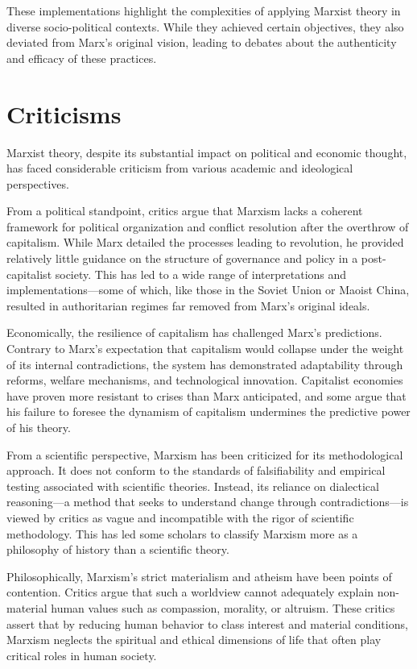 \documentclass[14pt, russian]{matmex-diploma-custom}
\begin{document}
These implementations highlight the complexities of applying Marxist theory in diverse socio-political contexts. While they achieved certain objectives, they also deviated from Marx's original vision, leading to debates about the authenticity and efficacy of these practices.

\section{Criticisms}

Marxist theory, despite its substantial impact on political and economic thought, has faced considerable criticism from various academic and ideological perspectives.

From a political standpoint, critics argue that Marxism lacks a coherent framework for political organization and conflict resolution after the overthrow of capitalism. While Marx detailed the processes leading to revolution, he provided relatively little guidance on the structure of governance and policy in a post-capitalist society. This has led to a wide range of interpretations and implementations—some of which, like those in the Soviet Union or Maoist China, resulted in authoritarian regimes far removed from Marx's original ideals.

Economically, the resilience of capitalism has challenged Marx’s predictions. Contrary to Marx's expectation that capitalism would collapse under the weight of its internal contradictions, the system has demonstrated adaptability through reforms, welfare mechanisms, and technological innovation. Capitalist economies have proven more resistant to crises than Marx anticipated, and some argue that his failure to foresee the dynamism of capitalism undermines the predictive power of his theory.

From a scientific perspective, Marxism has been criticized for its methodological approach. It does not conform to the standards of falsifiability and empirical testing associated with scientific theories. Instead, its reliance on dialectical reasoning—a method that seeks to understand change through contradictions—is viewed by critics as vague and incompatible with the rigor of scientific methodology. This has led some scholars to classify Marxism more as a philosophy of history than a scientific theory.

Philosophically, Marxism’s strict materialism and atheism have been points of contention. Critics argue that such a worldview cannot adequately explain non-material human values such as compassion, morality, or altruism. These critics assert that by reducing human behavior to class interest and material conditions, Marxism neglects the spiritual and ethical dimensions of life that often play critical roles in human society.
\end{document}
